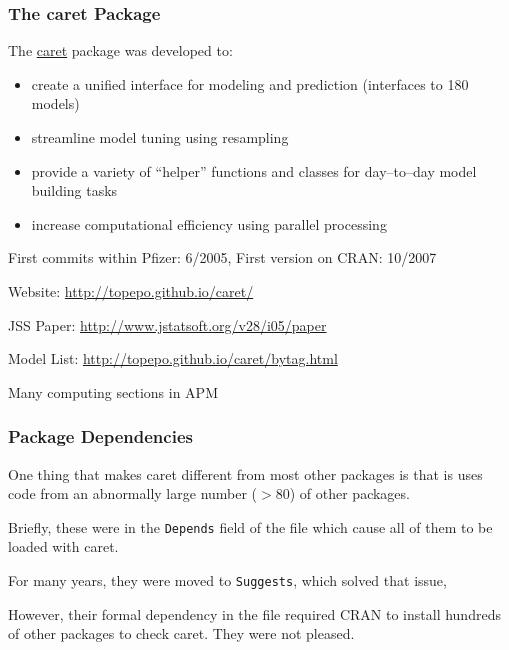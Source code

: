 \documentclass[12 pt]{beamer}\usepackage[]{graphicx}\usepackage[]{color}
\newcommand{\pkg}[1]{{\fontseries{b}\selectfont #1}}
\renewcommand{\pkg}[1]{{\color{darkgreen}\textsf{#1}}}
\begin{document}
  \begin{frame}[fragile]
\frametitle{The \pkg{caret} Package}

The \href{http://cran.r-project.org/web/packages/caret/index.html}{\pkg{caret}}  package was developed to:
  \begin{itemize}
\item create a unified interface for modeling and prediction
(interfaces to 180 models)
\item streamline model tuning using resampling
\item provide a variety of ``helper'' functions and classes for day--to--day model building tasks 
\item increase computational efficiency using parallel processing  
\end{itemize}

\vspace{.07in}

First commits within Pfizer: 6/2005, First version on CRAN: 10/2007

\vspace{.06in}

Website: \href{http://topepo.github.io/caret/}{http://topepo.github.io/caret/}

\vspace{.06in}

JSS Paper: \href{http://www.jstatsoft.org/v28/i05/paper}{http://www.jstatsoft.org/v28/i05/paper}

\vspace{.06in}

Model List: \href{http://topepo.github.io/caret/bytag.html}{http://topepo.github.io/caret/bytag.html}

\vspace{.06in}

Many computing sections in APM

\end{frame}

  
  \begin{frame}[fragile]
\frametitle{Package Dependencies}



One thing that makes \pkg{caret} different from most other packages is that is uses code from an abnormally large number ($> 80$) of other packages. 

\vspace{.15in}

Briefly, these were in the \texttt{Depends} field of the  file which cause all of them to be loaded with \pkg{caret}.

\vspace{.15in}

For many years, they were moved to \texttt{Suggests}, which solved that issue, 


\vspace{.15in}

However, their formal dependency in the  file required CRAN  to install hundreds of other packages to check  \pkg{caret}. They were not pleased. 

\end{frame}
\end{document}
